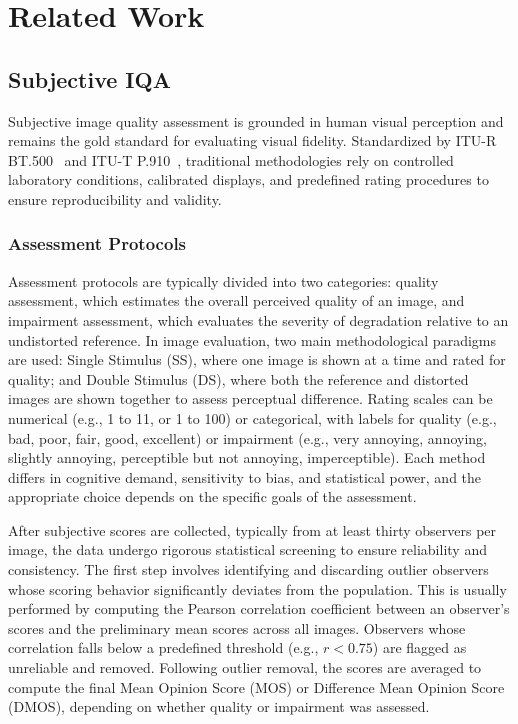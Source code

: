 \chapter{Related Work}\label{chap:related_work}


\section{Subjective IQA}\label{sec:subjective_iqa}

Subjective image quality assessment is grounded in human visual perception and remains the gold standard for evaluating visual fidelity. Standardized by ITU-R BT.500~\cite{ITU-R-BT500} and ITU-T P.910~\cite{itut2006}, traditional methodologies rely on controlled laboratory conditions, calibrated displays, and predefined rating procedures to ensure reproducibility and validity.

\subsection{Assessment Protocols}\label{sec:assessment_protocols}

Assessment protocols are typically divided into two categories: quality assessment, which estimates the overall perceived quality of an image, and impairment assessment, which evaluates the severity of degradation relative to an undistorted reference. In image evaluation, two main methodological paradigms are used: Single Stimulus (SS), where one image is shown at a time and rated for quality; and Double Stimulus (DS), where both the reference and distorted images are shown together to assess perceptual difference. Rating scales can be numerical (e.g., 1 to 11, or 1 to 100) or categorical, with labels for quality (e.g., bad, poor, fair, good, excellent) or impairment (e.g., very annoying, annoying, slightly annoying, perceptible but not annoying, imperceptible). Each method differs in cognitive demand, sensitivity to bias, and statistical power, and the appropriate choice depends on the specific goals of the assessment.

After subjective scores are collected, typically from at least thirty observers per image, the data undergo rigorous statistical screening to ensure reliability and consistency. The first step involves identifying and discarding outlier observers whose scoring behavior significantly deviates from the population. This is usually performed by computing the Pearson correlation coefficient between an observer's scores and the preliminary mean scores across all images. Observers whose correlation falls below a predefined threshold (e.g., $r < 0.75$) are flagged as unreliable and removed. Following outlier removal, the scores are averaged to compute the final Mean Opinion Score (MOS) or Difference Mean Opinion Score (DMOS), depending on whether quality or impairment was assessed.

